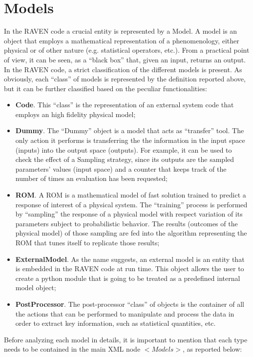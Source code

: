 \section{Models  \\ \vspace{2 mm} {\small }}
\label{sec:models}
In the RAVEN code a crucial entity is represented by a Model. A model is an object that employs a mathematical representation of a phenomenology, either physical or of other nature (e.g. statistical operators, etc.). From a practical point of view, it can be seen, as a ``black box'' that, given an input, returns an output. 
\\ In the RAVEN code, a strict  classification of the different models is present. As obviously, each ``class'' of models is represented by the definition reported above, but it can be further classified based on the peculiar functionalities:
\begin{itemize}
\item \textbf{Code}. This ``class'' is the representation of an external system code that employs an high fidelity physical model;
\item \textbf{Dummy}. The ``Dummy'' object is a model that acts as ``transfer'' tool. The only action it performs is transferring the the information in the input space (inputs) into the output space (outputs). For example, it can be used to check the effect of a Sampling strategy, since its outputs are the sampled parameters' values (input space) and a counter that keeps track of the number of times an evaluation has been requested; 
\item \textbf{ROM}. A ROM is a mathematical model of fast solution trained to predict a response of interest of a physical system. The ``training'' process is performed by “sampling” the response of a physical model with respect variation of its parameters subject to probabilistic behavior. The results (outcomes of the physical model) of those sampling are fed into the algorithm representing the ROM that tunes itself to replicate those results;
\item \textbf{ExternalModel}. As the name suggests, an external model  is an entity that is embedded in the RAVEN code at run time. This object allows the user to create a python module that is going to be treated as a predefined internal model object;
\item \textbf{PostProcessor}.  The post-processor ``class'' of objects  is the container of all the actions that can be performed to manipulate and process the data in order to extract key information, such as statistical quantities, etc. 
\end{itemize}
Before analyzing  each model in details, it is important to mention that each type needs to be contained in the main XML node $<Models>$, as reported below:

